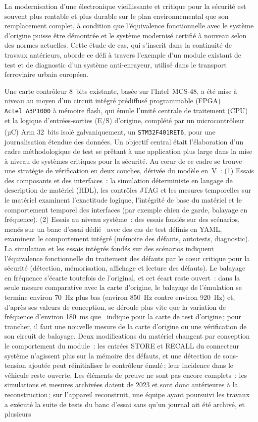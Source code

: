 La modernisation d’une électronique vieillissante et critique pour la sécurité est souvent plus rentable et plus durable sur le plan environnemental que son remplacement complet, à condition que l’équivalence fonctionnelle avec le système d’origine puisse être démontrée et le système modernisé certifié à nouveau selon des normes actuelles. Cette étude de cas, qui s’inscrit dans la continuité de travaux antérieurs, aborde ce défi à travers l’exemple d’un module existant de test et de diagnostic d’un système anti-enrayeur, utilisé dans le transport ferroviaire urbain européen.

Une carte contrôleur 8 bits existante, basée sur l’Intel~MCS-48, a été mise à niveau au moyen d’un circuit intégré prédiffusé programmable (FPGA) \texttt{Actel~A3P1000} à mémoire flash, qui émule l’unité centrale de traitement (CPU) et la logique d’entrées-sorties (E/S) d’origine, complété par un microcontrôleur (µC) Arm\textsuperscript{\textregistered} 32 bits isolé galvaniquement, un \texttt{STM32F401RET6}, pour une journalisation étendue des données. Un objectif central était l’élaboration d’un cadre méthodologique de test se prêtant à une application plus large dans la mise à niveau de systèmes critiques pour la sécurité. Au cœur de ce cadre se trouve une stratégie de vérification en deux couches, dérivée du modèle en~V : (1) Essais des composants et des interfaces : la simulation déterministe en langage de description de matériel (HDL), les contrôles JTAG et les mesures temporelles sur le matériel examinent l’exactitude logique, l’intégrité de base du matériel et le comportement temporel des interfaces (par exemple chien de garde, balayage en fréquence). (2) Essais au niveau système : des essais fondés sur des scénarios, menés sur un banc d’essai dédié~\cite{dolata2023} avec des cas de test définis en YAML, examinent le comportement intégré (mémoire des défauts, autotests, diagnostic). La simulation et les essais intégrés fondés sur des scénarios indiquent l’équivalence fonctionnelle du traitement des défauts par le cœur critique pour la sécurité (détection, mémorisation, affichage et lecture des défauts). Le balayage en fréquence s’écarte toutefois de l’original, et cet écart reste ouvert : dans la seule mesure comparative avec la carte d’origine, le balayage de l’émulation se termine environ 70~Hz plus bas (environ 850~Hz contre environ 920~Hz) et, d’après ses valeurs de conception, se déroule plus vite que la variation de fréquence d’environ 180~ms que~\cite{dolata2023} indique pour la carte de test d’origine ; pour trancher, il faut une nouvelle mesure de la carte d’origine ou une vérification de son circuit de balayage. Deux modifications du matériel changent par conception le comportement du module : les entrées STORE et RECALL du connecteur système n’agissent plus sur la mémoire des défauts, et une détection de sous-tension ajoutée peut réinitialiser le contrôleur émulé ; leur incidence dans le véhicule reste ouverte. Les éléments de preuve ne sont pas encore complets : les simulations et mesures archivées datent de 2023 et sont donc antérieures à la reconstruction ; sur l’appareil reconstruit, une équipe ayant poursuivi les travaux a exécuté la suite de tests du banc d’essai sans qu’un journal ait été archivé, et plusieurs 